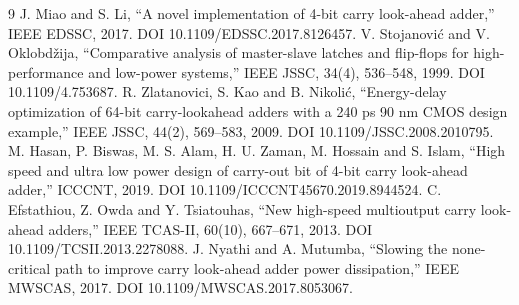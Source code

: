 \documentclass[10pt,a4paper]{article}
\begin{document}
\begin{thebibliography}{9}
 J. Miao and S. Li, ``A novel implementation of 4-bit carry look-ahead adder,'' IEEE EDSSC, 2017. DOI 10.1109/EDSSC.2017.8126457.
 V. Stojanovi\'c and V. Oklobd\v{z}ija, ``Comparative analysis of master-slave latches and flip-flops for high-performance and low-power systems,'' IEEE JSSC, 34(4), 536--548, 1999. DOI 10.1109/4.753687.
 R. Zlatanovici, S. Kao and B. Nikoli\'c, ``Energy-delay optimization of 64-bit carry-lookahead adders with a 240 ps 90 nm CMOS design example,'' IEEE JSSC, 44(2), 569--583, 2009. DOI 10.1109/JSSC.2008.2010795.
 M. Hasan, P. Biswas, M. S. Alam, H. U. Zaman, M. Hossain and S. Islam, ``High speed and ultra low power design of carry-out bit of 4-bit carry look-ahead adder,'' ICCCNT, 2019. DOI 10.1109/ICCCNT45670.2019.8944524.
 C. Efstathiou, Z. Owda and Y. Tsiatouhas, ``New high-speed multioutput carry look-ahead adders,'' IEEE TCAS-II, 60(10), 667--671, 2013. DOI 10.1109/TCSII.2013.2278088.
 J. Nyathi and A. Mutumba, ``Slowing the none-critical path to improve carry look-ahead adder power dissipation,'' IEEE MWSCAS, 2017. DOI 10.1109/MWSCAS.2017.8053067.
\end{thebibliography}
\end{document}
